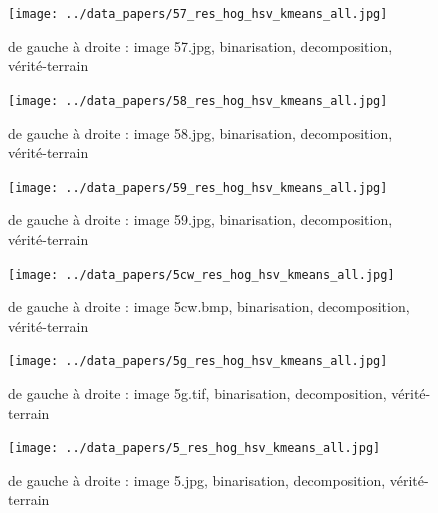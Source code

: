 \documentclass{book}
\begin{document}
\begin{figure}[H]
\begin{center}
\texttt{[image: ../data\_papers/57\_res\_hog\_hsv\_kmeans\_all.jpg]}
\end{center}
\caption{de gauche à droite : image 57.jpg, binarisation, decomposition, vérité-terrain}
\label{57}
\end{figure}
\clearpage


\begin{figure}[H]
\begin{center}
\texttt{[image: ../data\_papers/58\_res\_hog\_hsv\_kmeans\_all.jpg]}
\end{center}
\caption{de gauche à droite : image 58.jpg, binarisation, decomposition, vérité-terrain}
\label{58}
\end{figure}
\clearpage


\begin{figure}[H]
\begin{center}
\texttt{[image: ../data\_papers/59\_res\_hog\_hsv\_kmeans\_all.jpg]}
\end{center}
\caption{de gauche à droite : image 59.jpg, binarisation, decomposition, vérité-terrain}
\label{59}
\end{figure}
\clearpage


\begin{figure}[H]
\begin{center}
\texttt{[image: ../data\_papers/5cw\_res\_hog\_hsv\_kmeans\_all.jpg]}
\end{center}
\caption{de gauche à droite : image 5cw.bmp, binarisation, decomposition, vérité-terrain}
\label{5cw}
\end{figure}
\clearpage


\begin{figure}[H]
\begin{center}
\texttt{[image: ../data\_papers/5g\_res\_hog\_hsv\_kmeans\_all.jpg]}
\end{center}
\caption{de gauche à droite : image 5g.tif, binarisation, decomposition, vérité-terrain}
\label{5g}
\end{figure}
\clearpage


\begin{figure}[H]
\begin{center}
\texttt{[image: ../data\_papers/5\_res\_hog\_hsv\_kmeans\_all.jpg]}
\end{center}
\caption{de gauche à droite : image 5.jpg, binarisation, decomposition, vérité-terrain}
\label{5}
\end{figure}
\clearpage
\end{document}
